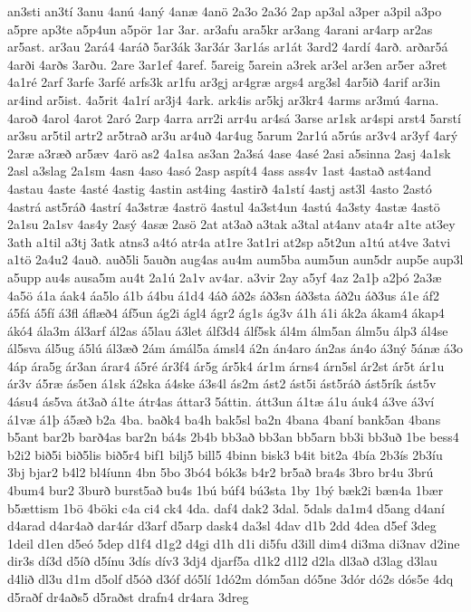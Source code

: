 {an3sti
an3tí
3anu
4anú
4aný
4anæ
4anö
2a3o
2a3ó
2ap
ap3al
a3per
a3pil
a3po
a5pre
ap3te
a5p4un
a5pör
1ar
3ar.
ar3afu
ara5kr
ar3ang
4arani
ar4arp
ar2as
ar5ast.
ar3au
2ará4
4aráð
5ar3ák
3ar3ár
3ar1ás
ar1át
3ard2
4ardí
4arð.
arðar5á
4arði
4arðs
3arðu.
2are
3ar1ef
4aref.
5areig
5arein
a3rek
ar3el
ar3en
ar5er
a3ret
4a1ré
2arf
3arfe
3arfé
arfs3k
ar1fu
ar3gj
ar4græ
args4
arg3sl
4ar5ið
4arif
ar3in
ar4ind
ar5ist.
4a5rit
4a1rí
ar3j4
4ark.
ark4is
ar5kj
ar3kr4
4arms
ar3mú
4arna.
4aroð
4arol
4arot
2aró
2arp
4arra
arr2i
arr4u
ar4sá
3arse
ar1sk
ar4spi
arst4
5arstí
ar3su
ar5til
artr2
ar5trað
ar3u
ar4uð
4ar4ug
5arum
2ar1ú
a5rús
ar3v4
ar3yf
4arý
2aræ
a3ræð
ar5æv
4arö
as2
4a1sa
as3an
2a3sá
4ase
4asé
2asi
a5sinna
2asj
4a1sk
2asl
a3slag
2a1sm
4asn
4aso
4asó
2asp
aspít4
4ass
ass4v
1ast
4astað
ast4and
4astau
4aste
4asté
4astig
4astin
ast4ing
4astirð
4a1stí
4astj
ast3l
4asto
2astó
4astrá
ast5ráð
4astrí
4a3stræ
4aströ
4astul
4a3st4un
4astú
4a3sty
4astæ
4astö
2a1su
2a1sv
4as4y
2asý
4asæ
2asö
2at
at3að
a3tak
a3tal
at4anv
ata4r
a1te
at3ey
3ath
a1til
a3tj
3atk
atns3
a4tó
atr4a
at1re
3at1ri
at2sp
a5t2un
a1tú
at4ve
3atvi
a1tö
2a4u2
4auð.
auð5li
5auðn
aug4as
au4m
aum5ba
aum5un
aun5dr
aup5e
aup3l
a5upp
au4s
ausa5m
au4t
2a1ú
2a1v
av4ar.
a3vir
2ay
a5yf
4az
2a1þ
a2þó
2a3æ
4a5ö
á1a
áak4
áa5lo
á1b
á4bu
á1d4
4áð
áð2s
áð3sn
áð3sta
áð2u
áð3us
á1e
áf2
á5fá
á5fí
á3fl
áflæð4
áf5un
ág2i
ágl4
ágr2
ág1s
ág3v
á1h
á1i
ák2a
ákam4
ákap4
ákó4
ála3m
ál3arf
ál2as
á5lau
á3let
álf3d4
álf5sk
ál4m
álm5an
álm5u
álp3
ál4se
ál5sva
ál5ug
á5lú
ál3æð
2ám
ámál5a
ámsl4
á2n
án4aro
án2as
án4o
á3ný
5ánæ
á3o
4áp
ára5g
ár3an
árar4
á5ré
ár3f4
ár5g
ár5k4
ár1m
árns4
árn5sl
ár2st
ár5t
ár1u
ár3v
á5ræ
ás5en
á1sk
á2ska
á4ske
á3s4l
ás2m
ást2
ást5i
ást5ráð
ást5rík
ást5v
4ásu4
ás5va
át3að
á1te
átr4as
áttar3
5áttin.
átt3un
á1tæ
á1u
áuk4
á3ve
á3ví
á1væ
á1þ
á5æð
b2a
4ba.
baðk4
ba4h
bak5sl
ba2n
4bana
4baní
bank5an
4bans
b5ant
bar2b
barð4as
bar2n
bá4s
2b4b
bb3að
bb3an
bb5arn
bb3i
bb3uð
1be
bess4
b2i2
bið5i
bið5lis
bið5r4
bif1
bilj5
bill5
4binn
bisk3
b4it
bit2a
4bía
2b3ís
2b3íu
3bj
bjar2
b4l2
bl4íunn
4bn
5bo
3bó4
bók3s
b4r2
br5að
bra4s
3bro
br4u
3brú
4bum4
bur2
3burð
burst5að
bu4s
1bú
búf4
bú3sta
1by
1bý
bæk2i
bæn4a
1bær
b5ættism
1bö
4böki
c4a
ci4
ck4
4da.
daf4
dak2
3dal.
5dals
da1m4
d5ang
d4aní
d4arad
d4ar4að
dar4ár
d3arf
d5arp
dask4
da3sl
4dav
d1b
2dd
4dea
d5ef
3deg
1deil
d1en
d5eó
5dep
d1f4
d1g2
d4gi
d1h
d1i
di5fu
d3ill
dim4
di3ma
di3nav
d2ine
dir3s
dí3d
d5íð
d5ínu
3dís
dív3
3dj4
djarf5a
d1k2
d1l2
d2la
dl3að
d3lag
d3lau
d4lið
dl3u
d1m
d5olf
d5óð
d3óf
dó5lí
1dó2m
dóm5an
dó5ne
3dór
dó2s
dós5e
4dq
d5raðf
dr4aðs5
d5raðst
drafn4
dr4ara
3dreg
}
